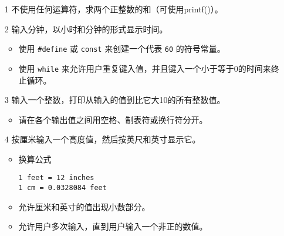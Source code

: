 \begin{frame}[fragile]\ft{\secname}
\begin{itemize}
\item[1] 不使用任何运算符，求两个正整数的和（可使用{\tf printf()}）。
\end{itemize}
\end{frame}



\begin{frame}[fragile]\ft{\secname}
\begin{itemize}
\item[2] 输入分钟，以小时和分钟的形式显示时间。\\[.1in]
  \begin{itemize}
  \item 使用 \lstinline|#define| 或 \lstinline|const| 来创建一个代表 \lstinline|60| 的符号常量。\\[.1in]
  \item 使用 \lstinline|while| 来允许用户重复键入值，并且键入一个小于等于0的时间来终止循环。
  \end{itemize}
\end{itemize}
\end{frame}


\begin{frame}[fragile]\ft{\secname}
\begin{itemize}
\item[3] 输入一个整数，打印从输入的值到比它大10的所有整数值。\\[.1in]
  \begin{itemize}
  \item 请在各个输出值之间用空格、制表符或换行符分开。
  \end{itemize}
\end{itemize}
\end{frame}



\begin{frame}[fragile]\ft{\secname}
\begin{itemize}
\item[4] 按厘米输入一个高度值，然后按英尺和英寸显示它。\\[.1in]
  \begin{itemize}
  \item 换算公式
\begin{lstlisting}
1 feet = 12 inches
1 cm = 0.0328084 feet
\end{lstlisting}    
  \item 允许厘米和英寸的值出现小数部分。
  \item 允许用户多次输入，直到用户输入一个非正的数值。
  \end{itemize}

\end{itemize}

\end{frame}

